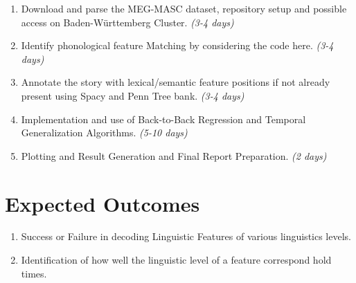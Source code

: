 \documentclass{tufte-handout}
\begin{document}
\begin{enumerate}
    \item Download and parse the MEG-MASC dataset, repository setup and possible access on Baden-Württemberg Cluster. \emph{(3-4 days)}
    
    \item Identify phonological feature Matching by considering the code here. \cite{gwilliams2020neural} \emph{(3-4 days)}
     
    \item Annotate the story with lexical/semantic feature positions if not already present using Spacy and Penn Tree bank.  \emph{(3-4 days)}

    \item Implementation and use of Back-to-Back Regression and Temporal Generalization Algorithms. \emph{(5-10 days)} 

    \item Plotting and Result Generation and Final Report Preparation. \emph{(2 days)}
    
\end{enumerate}

\section{Expected Outcomes}

\begin{enumerate}
    \item Success or Failure in decoding Linguistic Features of various linguistics levels.
    \item Identification of how well the linguistic level of a feature correspond hold times. 
\end{enumerate}





\end{document}
